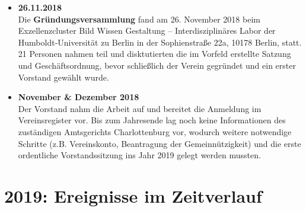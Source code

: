 \begin{itemize}
 \item \textbf{26.11.2018}\\
  Die \textbf{Gründungsversammlung} fand am 26. November 2018 beim Exzellenzcluster Bild Wissen Gestaltung -- Interdisziplinäres Labor der Humboldt-Universität zu Berlin in der Sophienstraße 22a, 10178 Berlin, statt.
  21 Personen nahmen teil und disktutierten die im Vorfeld erstellte Satzung und Geschäftsordnung, bevor schließlich der Verein gegründet und ein erster Vorstand gewählt wurde.
 \item \textbf{November \& Dezember 2018}\\
  Der Vorstand nahm die Arbeit auf und bereitet die Anmeldung im Vereinsregister vor.
  Bis zum Jahresende lag noch keine Informationen des zuständigen Amtsgerichts Charlottenburg vor, wodurch weitere notwendige Schritte (z.B. Vereinskonto, Beantragung der Gemeinnützigkeit) und die erste ordentliche Vorstandssitzung ins Jahr 2019 gelegt werden mussten.
\end{itemize}

\section{2019: Ereignisse im Zeitverlauf}

